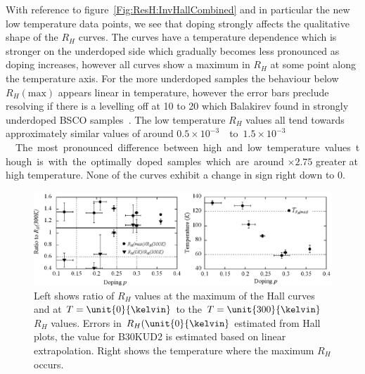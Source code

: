 With reference to figure~\ref{Fig:ResH:InvHallCombined} and in particular the new low temperature data points, we see that doping strongly affects the qualitative shape of the $R_H$ curves. The curves have a temperature dependence which is stronger on the underdoped side which gradually becomes less pronounced as doping increases, however all curves show a maximum in $R_H$ at some point along the temperature axis. For the more underdoped samples the behaviour below $R_H(\textrm{max})$ appears linear in temperature, however the error bars preclude resolving if there is a levelling off at \unit{10}{\kelvin} to \unit{20}{\kelvin} which Balakirev \etal found in strongly underdoped \ac{BSCO} samples~\cite{Balakirev2003}. The low temperature $R_H$ values all tend towards approximately similar values of around \unit{$0.5\times 10^{-3}$}{\centi\metre\cubed\per\coulomb} to \unit{$1.5\times 10^{-3}$}{\centi\metre\cubed\per\coulomb}. The most pronounced difference between high and low temperature values though is with the optimally doped samples which are around $\times 2.75$ greater at high temperature. None of the curves exhibit a change in sign right down to \unit{0}{\kelvin}. 


\begin{figure}[htbp]
    \begin{center}
        \includegraphics[scale=0.8]{Chapter-HallBSCO/Figures/RhRatios/RhRatios}
        \caption{Left shows ratio of $R_H$ values at the maximum of the Hall curves and at $T=\unit{0}{\kelvin}$ to the $T=\unit{300}{\kelvin}$ $R_H$ values. Errors in $R_H(\unit{0}{\kelvin}$ estimated from Hall plots, the value for B30KUD2 is estimated based on linear extrapolation. Right shows the temperature where the maximum $R_H$ occurs.}
        \label{Fig:ResH:RhRatios}
    \end{center}
\end{figure}

